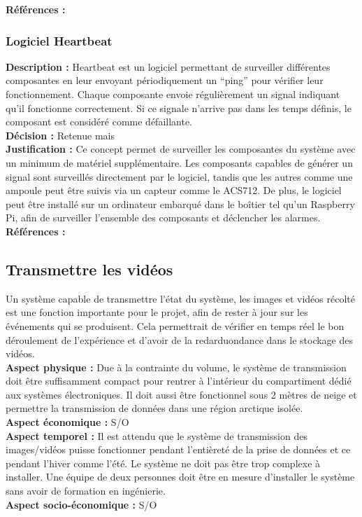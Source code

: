 \noindent
\textbf{Références :} \cite{27} \\

\subsubsection{Logiciel Heartbeat}

\noindent
\textbf{Description :} Heartbeat est un logiciel permettant de surveiller différentes
composantes en leur envoyant périodiquement un “ping” pour vérifier leur
fonctionnement. Chaque composante envoie régulièrement un signal indiquant
qu’il fonctionne correctement. Si ce signale n’arrive pas dans les temps
définis, le composant est considéré comme défaillante. \\

\noindent
\textbf{Décision :} Retenue mais \\

\noindent
\textbf{Justification :} Ce concept permet de surveiller les composantes du système avec
un minimum de matériel supplémentaire. Les composants capables de générer un
signal sont surveillés directement par le logiciel, tandis que les autres comme
une ampoule peut être suivis via un capteur comme le ACS712. De plus, le
logiciel peut être installé sur un ordinateur embarqué dans le boîtier tel
qu'un Raspberry Pi, afin de surveiller l’ensemble des composants et déclencher
les alarmes. \\

\noindent
\textbf{Références :} \\



\subsection{Transmettre les vidéos}

Un système capable de transmettre l’état du système, les images et vidéos
récolté est une fonction importante pour le projet, afin de rester à jour sur
les événements qui se produisent. Cela permettrait de vérifier en temps réel le
bon déroulement de l’expérience et d’avoir de la redarduondance dans le
stockage des vidéos. \\

\noindent
\textbf{Aspect physique :} Due à la contrainte du volume, le système
de transmission doit être suffisamment compact pour rentrer à l’intérieur du
compartiment dédié aux systèmes électroniques. Il doit aussi être fonctionnel
sous 2 mètres de neige et permettre la transmission de données dans une région
arctique isolée. \\
\textbf{Aspect économique :} S/O \\
\textbf{Aspect temporel :} Il est attendu que le
système de transmission des images/vidéos puisse fonctionner pendant
l’entièreté de la prise de données et ce pendant l’hiver comme l’été. Le
système ne doit pas être trop complexe à installer. Une équipe de deux
personnes doit être en mesure d’installer le système sans avoir de formation en
ingénierie. \\
\textbf{Aspect socio-économique :} S/O

